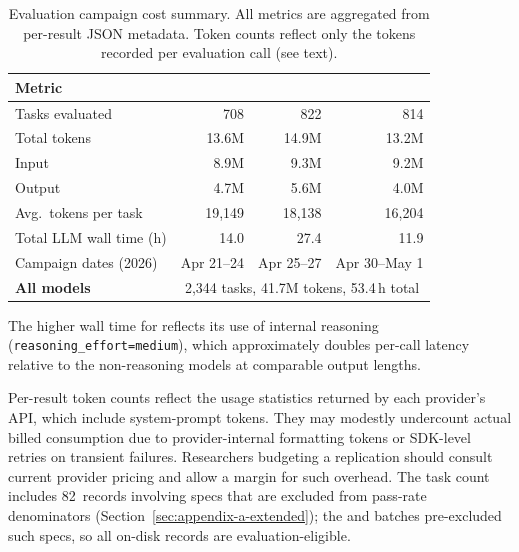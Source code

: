 \begin{table}[h]
    \centering
    \caption{Evaluation campaign cost summary. All metrics are aggregated from per-result JSON metadata. Token counts reflect only the tokens recorded per evaluation call (see text).}
    \label{tab:eval-cost}
    \begin{tabular}{lrrr}
        \toprule
        \textbf{Metric} & \textbf{\qwenshort{}} & \textbf{\gptnew{}} & \textbf{\codex{}} \\
        \midrule
        Tasks evaluated & 708 & 822 & 814 \\
        Total tokens & 13.6M & 14.9M & 13.2M \\
        \quad Input & 8.9M & 9.3M & 9.2M \\
        \quad Output & 4.7M & 5.6M & 4.0M \\
        Avg.\ tokens per task & 19{,}149 & 18{,}138 & 16{,}204 \\
        Total LLM wall time (h) & 14.0 & 27.4 & 11.9 \\
        Campaign dates (2026) & Apr 21--24 & Apr 25--27 & Apr 30--May 1 \\
        \midrule
        \textbf{All models} & \multicolumn{3}{c}{2{,}344 tasks, 41.7M tokens, 53.4\,h total} \\
        \bottomrule
    \end{tabular}
\end{table}

The higher wall time for \gptnew{} reflects its use of internal
reasoning (\texttt{reasoning\_effort=medium}), which approximately doubles
per-call latency relative to the non-reasoning models at comparable output
lengths.

Per-result token counts reflect the usage statistics returned by each
provider's API, which include system-prompt tokens.
They may modestly undercount actual billed consumption due to
provider-internal formatting tokens or SDK-level retries on transient
failures. Researchers budgeting a replication should consult current
provider pricing and allow a margin for such overhead.
The \qwenshort{} task count includes 82~records involving \knownfail{}
specs that are excluded from pass-rate denominators
(Section~\ref{sec:appendix-a-extended}); the \gptnew{} and \codex{}
batches pre-excluded such specs, so all on-disk records are
evaluation-eligible.

